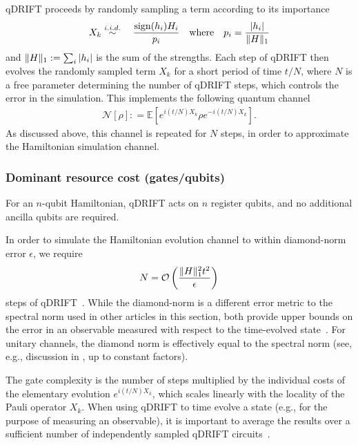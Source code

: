 \begin{refsection}
qDRIFT proceeds by randomly sampling a term according to its importance
\begin{align}
    X_k \stackrel{i.i.d.}{\sim} \quad \frac{\mathrm{sign}(h_i) H_i}{p_i} \quad \text{where} \quad p_i = \frac{|h_i|}{\lVert H\rVert_1}
\end{align}
and $\lVert H\rVert_1: = \sum_i |h_i|$ is the sum of the strengths. Each step of qDRIFT then evolves the randomly sampled term $X_k$ for a short period of time $t/N$, where $N$ is a free parameter determining the number of qDRIFT steps, which controls the error in the simulation. This implements the following quantum channel
\begin{align}
    \mathcal{N}[\rho]: = \mathbb{E}[e^{i(t/N)X_k}\rho e^{-i(t/N)X_k}].
\end{align}
As discussed above, this channel is repeated for $N$ steps, in order to approximate the Hamiltonian simulation channel.



\subsubsection*{Dominant resource cost (gates/qubits)}
For an $n$-qubit Hamiltonian, qDRIFT acts on $n$ register qubits, and no additional ancilla qubits are required.

In order to simulate the Hamiltonian evolution channel to within diamond-norm error $\epsilon$, we require 
\begin{align}
        N = \mathcal{O}\left(  \frac{\lVert H\rVert_1^2 t^2}{\epsilon}  \right)
\end{align} 
steps of qDRIFT~\cite{campbell2019randomCompiler,chen2021conRandomProduct}. While the diamond-norm is a different error metric to the spectral norm used in other articles in this section, both provide upper bounds on the error in an observable measured with respect to the time-evolved state~\cite{campbell2019randomCompiler}. For unitary channels, the diamond norm is effectively equal to the spectral norm (see, e.g., discussion in \cite{haah2023QueryOptimalChannels}, up to constant factors).

The gate complexity is the number of steps multiplied by the individual costs of the elementary evolution $e^{i(t/N)X_k}$, which scales linearly with the locality of the Pauli operator $X_k$. When using qDRIFT to time evolve a state (e.g., for the purpose of measuring an observable), it is important to average the results over a sufficient number of independently sampled qDRIFT circuits~\cite{campbell2019randomCompiler}.


\end{refsection}
